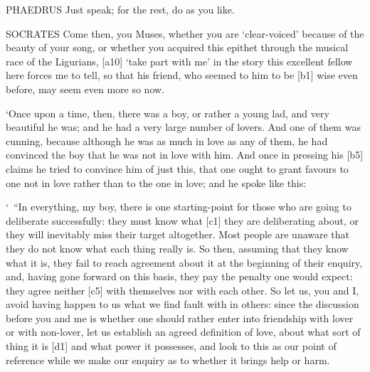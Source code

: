 PHAEDRUS Just speak; for the rest, do as you like.

SOCRATES Come then, you Muses, whether you are ‘clear-voiced' because of
the beauty of your song, or whether you acquired this epithet through
the musical race of the
Ligurians, {[}a10{]}
‘take part with me' in
the story this excellent fellow here forces me to tell, so that his
friend, who seemed to him
to be {[}b1{]} wise even before, may seem even more so now.

‘Once upon a time, then, there was a boy, or rather a young lad, and
very beautiful he was; and he had a very large number of lovers. And one
of them was cunning, because although he was as much in love as any of
them, he had convinced the boy that he was not in love with him. And
once in pressing his {[}b5{]} claims he tried to convince him of just
this, that one ought to grant favours to one not in love rather than to
the one in love; and he spoke like this:

‘~“In everything, my boy, there is one starting-point for those who are
going to deliberate successfully: they must know what {[}c1{]} they are
deliberating about, or they will inevitably miss their target
altogether. Most people are unaware that they do not know what each
thing really is. So then,
assuming that they know what it is, they fail to reach agreement about
it at the beginning of their enquiry, and, having gone forward on this
basis, they pay the penalty one would expect: they agree neither
{[}c5{]} with themselves nor with each other. So let us, you and I,
avoid having happen to us what we find fault with in others: since the
discussion before you and me is whether one should rather enter into
friendship with lover or with non-lover, let us establish an agreed
definition of love, about what sort of thing it is {[}d1{]} and what
power it possesses, and look to this as our point of reference while we
make our enquiry as to whether it brings help or harm.

